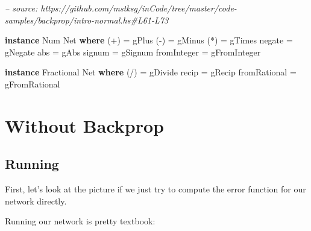 \documentclass[]{article}
\newenvironment{Shaded}{}{}
\newcommand{\CommentTok}[1]{\textcolor[rgb]{0.38,0.63,0.69}{\textit{#1}}}
\newcommand{\DataTypeTok}[1]{\textcolor[rgb]{0.56,0.13,0.00}{#1}}
\newcommand{\DecValTok}[1]{\textcolor[rgb]{0.25,0.63,0.44}{#1}}
\newcommand{\FunctionTok}[1]{\textcolor[rgb]{0.02,0.16,0.49}{#1}}
\newcommand{\KeywordTok}[1]{\textcolor[rgb]{0.00,0.44,0.13}{\textbf{#1}}}
\newcommand{\NormalTok}[1]{#1}
\newcommand{\OtherTok}[1]{\textcolor[rgb]{0.00,0.44,0.13}{#1}}
\begin{document}
\begin{Shaded}
\begin{Highlighting}[]
\CommentTok{-- source: https://github.com/mstksg/inCode/tree/master/code-samples/backprop/intro-normal.hs#L61-L73}

\KeywordTok{instance} \DataTypeTok{Num} \DataTypeTok{Net} \KeywordTok{where}
\NormalTok{    (}\FunctionTok{+}\NormalTok{)         }\FunctionTok{=}\NormalTok{ gPlus}
\NormalTok{    (}\FunctionTok{-}\NormalTok{)         }\FunctionTok{=}\NormalTok{ gMinus}
\NormalTok{    (}\FunctionTok{*}\NormalTok{)         }\FunctionTok{=}\NormalTok{ gTimes}
\NormalTok{    negate      }\FunctionTok{=}\NormalTok{ gNegate}
\NormalTok{    abs         }\FunctionTok{=}\NormalTok{ gAbs}
\NormalTok{    signum      }\FunctionTok{=}\NormalTok{ gSignum}
\NormalTok{    fromInteger }\FunctionTok{=}\NormalTok{ gFromInteger}

\KeywordTok{instance} \DataTypeTok{Fractional} \DataTypeTok{Net} \KeywordTok{where}
\NormalTok{    (}\FunctionTok{/}\NormalTok{)          }\FunctionTok{=}\NormalTok{ gDivide}
\NormalTok{    recip        }\FunctionTok{=}\NormalTok{ gRecip}
\NormalTok{    fromRational }\FunctionTok{=}\NormalTok{ gFromRational}
\end{Highlighting}
\end{Shaded}

\hypertarget{without-backprop}{%
\section{Without Backprop}\label{without-backprop}}

\hypertarget{running}{%
\subsection{Running}\label{running}}

First, let's look at the picture if we just try to compute the error function
for our network directly.

Running our network is pretty textbook:

\begin{Shaded}
\end{Shaded}
\end{document}
